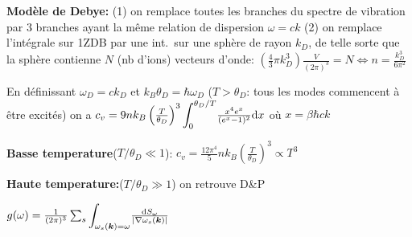 \begin{squishlist}
    \item \textbf{Modèle de Debye:} (1) on remplace toutes les branches du spectre de vibration par 3 branches ayant la même relation de dispersion $\omega = ck$
    (2) on remplace l'intégrale sur 1ZDB par une int.\ sur une sphère de rayon $k_D$, de telle sorte que la sphère contienne $N$ (nb d'ions) vecteurs d'onde: 
    $\left( \frac{4}{3}\pi k_D^3 \right) \frac{V}{(2\pi)^3} = N \Longleftrightarrow n = \frac{k_D^3}{6 \pi^2}$
    \item En définissant $\omega_D = ck_D$ et $k_B \theta_D = \hbar \omega_D$ ($T > \theta_D$: tous les modes commencent à être excités) on a
    $c_v = 9 n k_B \left(\frac{T}{\theta_D}\right)^3 {\displaystyle \int_0^{\theta_D/T}} \frac{x^4 e^x}{(e^x - 1)^2} \textrm{d} x$ où $x = \beta \hbar c k$
    \item \textbf{Basse temperature}($T/\theta_D \ll 1$): $c_v = \frac{12\pi^4}{5} n k_B \left( \frac{T}{\theta_D}\right)^3 \propto T^3$
    \item \textbf{Haute temperature:}($T/\theta_D \gg 1$) on retrouve D\&P
\end{squishlist}

\begin{squishlist}
    \item $g(\omega) = \frac{1}{(2\pi)^3} \sum_s {\displaystyle \int_{\omega_s(\bm{k}) = \omega}} \frac{\textrm{d} S_{\omega}}{|\nabla \omega_s(\bm{k})|}$
\end{squishlist}

